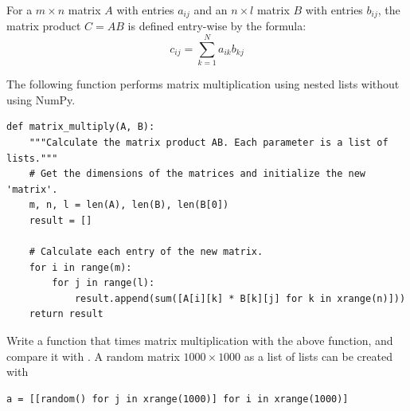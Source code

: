 \begin{problem} %
For a $m\times n$ matrix $A$ with entries $a_{ij}$ and an $n\times l$ matrix $B$ with entries $b_{ij}$, the matrix product $C = AB$ is defined entry-wise by the formula:
\[c_{ij} = \sum_{k=1}^N a_{ik}b_{kj}\]

The following function performs matrix multiplication using nested lists without using NumPy.

\begin{lstlisting}
def matrix_multiply(A, B):
    """Calculate the matrix product AB. Each parameter is a list of lists."""
    # Get the dimensions of the matrices and initialize the new 'matrix'.
    m, n, l = len(A), len(B), len(B[0])
    result = []

    # Calculate each entry of the new matrix.
    for i in range(m):
        for j in range(l):
            result.append(sum([A[i][k] * B[k][j] for k in xrange(n)]))
    return result
\end{lstlisting}

Write a function that times matrix multiplication with the above function, and compare it with .
A random matrix $1000\times 1000$ as a list of lists can be created with

\begin{lstlisting}
a = [[random() for j in xrange(1000)] for i in xrange(1000)]
\end{lstlisting}

\end{problem}

